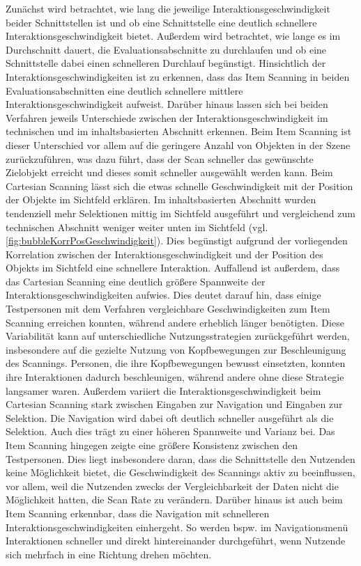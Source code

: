 Zunächst wird betrachtet, wie lang die jeweilige Interaktionsgeschwindigkeit beider Schnittstellen ist und ob eine Schnittstelle eine deutlich schnellere Interaktionsgeschwindigkeit bietet. Außerdem wird betrachtet, wie lange es im Durchschnitt dauert, die Evaluationsabschnitte zu durchlaufen und ob eine Schnittstelle dabei einen schnelleren Durchlauf begünstigt. 
Hinsichtlich der Interaktionsgeschwindigkeiten ist zu erkennen, dass das Item Scanning in beiden Evaluationsabschnitten eine deutlich schnellere mittlere Interaktionsgeschwindigkeit aufweist. Darüber hinaus lassen sich bei beiden Verfahren jeweils Unterschiede zwischen der Interaktionsgeschwindigkeit im technischen und im inhaltsbasierten Abschnitt erkennen. Beim Item Scanning ist dieser Unterschied vor allem auf die geringere Anzahl von Objekten in der Szene zurückzuführen, was dazu führt, dass der Scan schneller das gewünschte Zielobjekt erreicht und dieses somit schneller ausgewählt werden kann. Beim Cartesian Scanning lässt sich die etwas schnelle Geschwindigkeit mit der Position der Objekte im Sichtfeld erklären. Im inhaltsbasierten Abschnitt wurden tendenziell mehr Selektionen mittig im Sichtfeld ausgeführt und vergleichend zum technischen Abschnitt weniger weiter unten im Sichtfeld (vgl. \autoref{fig:bubbleKorrPosGeschwindigkeit}). Dies begünstigt aufgrund der vorliegenden Korrelation zwischen der Interaktionsgeschwindigkeit und der Position des Objekts im Sichtfeld eine schnellere Interaktion. 
Auffallend ist außerdem, dass das Cartesian Scanning eine deutlich größere Spannweite der Interaktionsgeschwindigkeiten aufwies. Dies deutet darauf hin, dass einige Testpersonen mit dem Verfahren vergleichbare Geschwindigkeiten zum Item Scanning erreichen konnten, während andere erheblich länger benötigten. Diese Variabilität kann auf unterschiedliche Nutzungsstrategien zurückgeführt werden, insbesondere auf die gezielte Nutzung von Kopfbewegungen zur Beschleunigung des Scannings. Personen, die ihre Kopfbewegungen bewusst einsetzten, konnten ihre Interaktionen dadurch beschleunigen, während andere ohne diese Strategie langsamer waren. Außerdem variiert die Interaktionsgeschwindigkeit beim Cartesian Scanning stark zwischen Eingaben zur Navigation und Eingaben zur Selektion. Die Navigation wird dabei oft deutlich schneller ausgeführt als die Selektion. Auch dies trägt zu einer höheren Spannweite und Varianz bei. Das Item Scanning hingegen zeigte eine größere Konsistenz zwischen den Testpersonen. Dies liegt insbesondere daran, dass die Schnittstelle den Nutzenden keine Möglichkeit bietet, die Geschwindigkeit des Scannings aktiv zu beeinflussen, vor allem, weil die Nutzenden zwecks der Vergleichbarkeit der Daten nicht die Möglichkeit hatten, die Scan Rate zu verändern. Darüber hinaus ist auch beim Item Scanning erkennbar, dass die Navigation mit schnelleren Interaktionsgeschwindigkeiten einhergeht. So werden bspw. im Navigationsmenü Interaktionen schneller und direkt hintereinander durchgeführt, wenn Nutzende sich mehrfach in eine Richtung drehen möchten. 

